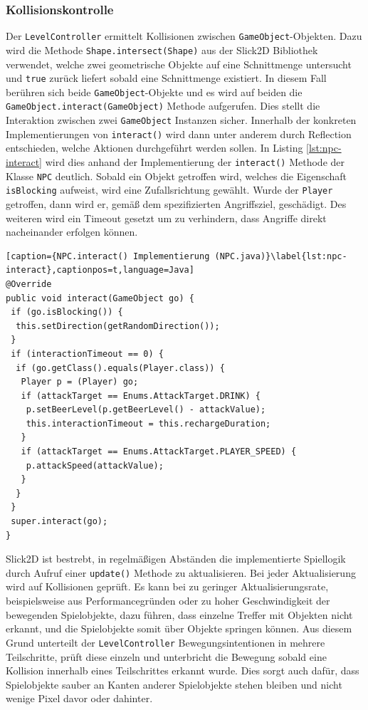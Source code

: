 \subsubsection{Kollisionskontrolle}
Der \texttt{LevelController} ermittelt Kollisionen zwischen \texttt{GameObject}-Objekten.
Dazu wird die Methode \texttt{Shape.intersect(Shape)} aus der Slick2D Bibliothek verwendet, welche zwei geometrische Objekte auf eine Schnittmenge untersucht und \texttt{true} zurück liefert sobald eine Schnittmenge existiert.
In diesem Fall berühren sich beide \texttt{GameObject}-Objekte und es wird auf beiden die \texttt{GameObject.interact(GameObject)} Methode aufgerufen.
Dies stellt die Interaktion zwischen zwei \texttt{GameObject} Instanzen sicher.
Innerhalb der konkreten Implementierungen von \texttt{interact()} wird dann unter anderem durch Reflection entschieden, welche Aktionen durchgeführt werden sollen.
In Listing \ref{lst:npc-interact} wird dies anhand der Implementierung der \texttt{interact()} Methode der Klasse \texttt{NPC} deutlich.
Sobald ein Objekt getroffen wird, welches die Eigenschaft \texttt{isBlocking} aufweist, wird eine Zufallsrichtung gewählt.
Wurde der \texttt{Player} getroffen, dann wird er, gemäß dem spezifizierten Angriffsziel, geschädigt. Des weiteren wird ein Timeout gesetzt um zu verhindern, dass Angriffe direkt nacheinander erfolgen können.

\begin{lstlisting}[caption={NPC.interact() Implementierung (NPC.java)}\label{lst:npc-interact},captionpos=t,language=Java]
@Override
public void interact(GameObject go) {
 if (go.isBlocking()) {
  this.setDirection(getRandomDirection());
 }
 if (interactionTimeout == 0) {
  if (go.getClass().equals(Player.class)) {
   Player p = (Player) go;
   if (attackTarget == Enums.AttackTarget.DRINK) {
    p.setBeerLevel(p.getBeerLevel() - attackValue);
    this.interactionTimeout = this.rechargeDuration;
   }
   if (attackTarget == Enums.AttackTarget.PLAYER_SPEED) {
    p.attackSpeed(attackValue);
   }
  }
 }
 super.interact(go);
}

\end{lstlisting}

Slick2D ist bestrebt, in regelmäßigen Abständen die implementierte Spiellogik durch Aufruf einer \texttt{update()} Methode zu aktualisieren.
Bei jeder Aktualisierung wird auf Kollisionen geprüft.
Es kann bei zu geringer Aktualisierungsrate, beispielsweise aus Performancegründen oder zu hoher Geschwindigkeit der bewegenden Spielobjekte, dazu führen, dass einzelne Treffer mit Objekten nicht erkannt, und die Spielobjekte somit über Objekte springen können.
Aus diesem Grund unterteilt der \texttt{LevelController} Bewegungsintentionen in mehrere Teilschritte, prüft diese einzeln und unterbricht die Bewegung sobald eine Kollision innerhalb eines Teilschrittes erkannt wurde.
Dies sorgt auch dafür, dass Spielobjekte sauber an Kanten anderer Spielobjekte stehen bleiben und nicht wenige Pixel davor oder dahinter.


